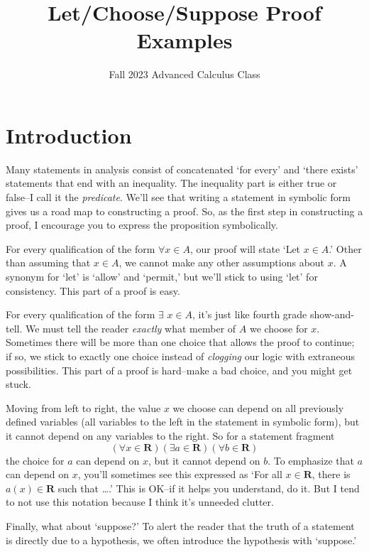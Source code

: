 \documentclass[12pt,fleqn,answers]{exam}
\title{Let/Choose/Suppose Proof Examples}
\author{Fall 2023 Advanced Calculus Class}
\newcommand{\reals}{\mathbf{R}}
\begin{document}
\maketitle

\section{Introduction}
Many statements in analysis consist of concatenated `for every' and `there exists' 
statements that end with an inequality. The inequality part is either true or 
false--I call it the \emph{predicate}. We'll see that writing a statement in 
symbolic form gives us a road map to constructing a proof. So, as the 
first step in constructing a proof, I encourage you to express the proposition 
symbolically.

For every qualification of the form $\forall x \in A$, our proof will state 
`Let $x \in A$.' Other than assuming that $x \in A$, we cannot make any other 
assumptions about $x$. A synonym for `let' is `allow' and `permit,'  but we'll 
stick to using `let' for consistency.  This part of a proof is easy.

For every qualification of the form $\exists \,\, x \in A$, it's just like fourth 
grade show-and-tell. We must tell the reader \emph{exactly} what member of $A$ 
we choose for $x$.  Sometimes there will be more than one choice that allows 
the proof to continue; if so, we stick to exactly one choice instead of 
\emph{clogging} our logic with extraneous possibilities.  This part of
a proof is hard--make a bad choice, and you might get stuck. 

Moving from left to right, the value $x$ we choose can 
depend on all previously defined variables (all variables to the left in
the statement in symbolic form), but 
it cannot depend on any variables to the right. So for a  statement fragment
\begin{equation*}
    \left(\forall x \in \reals \right) \left(\exists a \in \reals\right) \left(\forall b \in \reals\right) 
\end{equation*}
the choice for $a$ can depend on $x$, but it cannot depend on $b$.  To emphasize
that $a$ can depend on $x$, you'll sometimes see this expressed as `For all $x \in \reals$,
there is $a(x) \in \reals$ such that \dots.' This is OK--if it helps 
you understand, do it.  But I tend to not use this notation because I 
think it's unneeded clutter.

Finally, what about `suppose?' To alert the reader that 
the truth of a statement is directly due to a hypothesis, we often
introduce the hypothesis with `suppose.'
\end{document}
